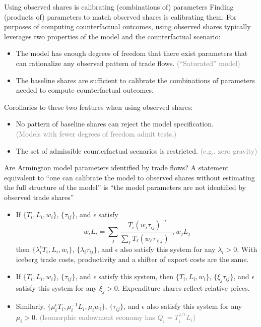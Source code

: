 \documentclass[11pt,notes=hide,aspectratio=169]{beamer}
\begin{document}
\begin{frame}{Using observed shares is calibrating (combinations of) parameters}
Finding (products of) parameters to match observed shares is calibrating them.
\medskip
For purposes of computing counterfactual outcomes, using observed shares typically leverages two properties of the model and the counterfactual scenario:
\begin{itemize}
\item
The model has enough degrees of freedom that there exist parameters that can rationalize any observed pattern of trade flows.
\textcolor{gray}{(``Saturated'' model)}
\item
The baseline shares are sufficient to calibrate the combinations of parameters needed to compute counterfactual outcomes.
\end{itemize}
\medskip
Corollaries to these two features when using observed shares:
\begin{itemize}
\item
No pattern of baseline shares can reject the model specification.\\
\textcolor{gray}{(Models with fewer degrees of freedom admit tests.)}
\item
The set of admissible counterfactual scenarios is restricted.
\textcolor{gray}{(e.g., zero gravity)}
\end{itemize}
\end{frame}
\begin{frame}{Are Armington model parameters identified by trade flows?}
A statement equivalent to
``one can calibrate the model to observed shares without estimating the full structure of the model''
is
``the model parameters are not identified by observed trade shares''
\begin{itemize}
\item
If $\{T_i,L_i,w_i\}$, $\{\tau_{ij}\}$, and $\epsilon$ satisfy
$$
w_i L_i
=
\sum_j \frac{T_i \left(w_i \tau_{ij}\right)^{-\epsilon}}{\sum_{\ell} T_{\ell} \left(w_{\ell} \tau_{\ell j}\right)^{-\epsilon}}
w_j L_j
$$
then
$\{\lambda_i^{\epsilon} T_i,L_i,w_i\}$, $\{\lambda_i \tau_{ij}\}$, and $\epsilon$
also satisfy this system
for any $\lambda_{i} > 0$.
With iceberg trade costs, productivity and a shifter of export costs are the same.
\item
If $\{T_i,L_i,w_i\}$, $\{\tau_{ij}\}$, and $\epsilon$ satisfy this system,
then
$\{T_i,L_i,w_i\}$, $\{\xi_j \tau_{ij}\}$, and $\epsilon$ satisfy this system for any $\xi_j > 0$.
Expenditure shares reflect relative prices.
\item
Similarly,
$\{\mu_{i}^{\epsilon} T_i,\mu_{i}^{-1} L_i,\mu_{i} w_i\}$, $\{\tau_{ij}\}$, and $\epsilon$
also satisfy this system
for any $\mu_{i} > 0$.
\textcolor{gray}{(Isomorphic endowment economy has $Q_i = T_i^{1/\epsilon} L_i$)}
\end{itemize}
\end{frame}
\end{document}
